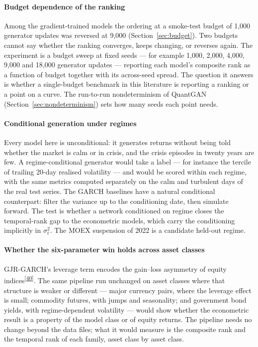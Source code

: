 \documentclass[11pt,a4paper]{article}
\makeatletter
\newcommand{\tcite}[1]{\textsuperscript{[\hyperlink{R:#1}{#1}]}}
\DeclareRobustCommand{\_}{\ifmmode\nfss@text{\textunderscore}\else\textunderscore\allowbreak\fi}
\makeatother
\begin{document}
\paragraph{Budget dependence of the ranking} Among the gradient-trained models the ordering at a smoke-test budget of 1{,}000 generator updates was reversed at 9,000 (Section~\ref{sec:budget}). Two budgets cannot say whether the ranking converges, keeps changing, or reverses again. The experiment is a budget sweep at fixed seeds --- for example 1{,}000, 2{,}000, 4{,}000, 9{,}000 and 18{,}000 generator updates --- reporting each model's composite rank as a function of budget together with its across-seed spread. The question it answers is whether a single-budget benchmark in this literature is reporting a ranking or a point on a curve. The run-to-run nondeterminism of QuantGAN (Section~\ref{sec:nondeterminism}) sets how many seeds each point needs.

\paragraph{Conditional generation under regimes} Every model here is unconditional: it generates returns without being told whether the market is calm or in crisis, and the crisis episodes in twenty years are few. A regime-conditional generator would take a label --- for instance the tercile of trailing 20-day realised volatility --- and would be scored within each regime, with the same metrics computed separately on the calm and turbulent days of the real test series. The GARCH baselines have a natural conditional counterpart: filter the variance up to the conditioning date, then simulate forward. The test is whether a network conditioned on regime closes the temporal-rank gap to the econometric models, which carry the conditioning implicitly in $\sigma_t^2$. The MOEX suspension of 2022 is a candidate held-out regime.

\paragraph{Whether the six-parameter win holds across asset classes} GJR-GARCH's leverage term encodes the gain--loss asymmetry of equity indices\tcite{40}. The same pipeline run unchanged on asset classes where that structure is weaker or different --- major currency pairs, where the leverage effect is small; commodity futures, with jumps and seasonality; and government bond yields, with regime-dependent volatility --- would show whether the econometric result is a property of the model class or of equity returns. The pipeline needs no change beyond the data files; what it would measure is the composite rank and the temporal rank of each family, asset class by asset class.
\end{document}
